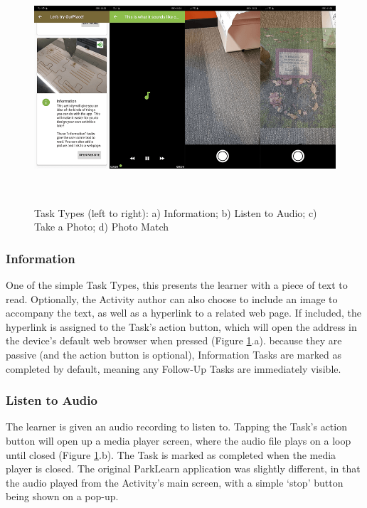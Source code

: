 \begin{figure}
  \centering
  \includegraphics[width=1\columnwidth]{images/chapter05/tasktypes1.png}
  \caption[Task Types (part 1)]{Task Types (left to right): a) Information; b) Listen to Audio; c) Take a Photo; d) Photo Match}~\label{fig:TaskTypes1}
\end{figure}

\subsubsection*{Information}
One of the simple Task Types, this presents the learner with a piece of text to read. Optionally, the Activity author can also choose to include an image to accompany the text, as well as a hyperlink to a related web page. If included, the hyperlink is assigned to the Task's action button, which will open the address in the device's default web browser when pressed (Figure \ref{fig:TaskTypes1}.a). because they are passive (and the action button is optional), Information Tasks are marked as completed by default, meaning any Follow-Up Tasks are immediately visible.

\subsubsection*{Listen to Audio}
The learner is given an audio recording to listen to. Tapping the Task's action button will open up a media player screen, where the audio file plays on a loop until closed (Figure \ref{fig:TaskTypes1}.b). The Task is marked as completed when the media player is closed. The original ParkLearn application was slightly different, in that the audio played from the Activity's main screen, with a simple `stop' button being shown on a pop-up.
    

